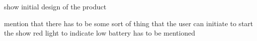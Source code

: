 show initial design of the product

mention that there has to be some sort of thing that the user can initiate to start the show
red light to indicate low battery has to be mentioned